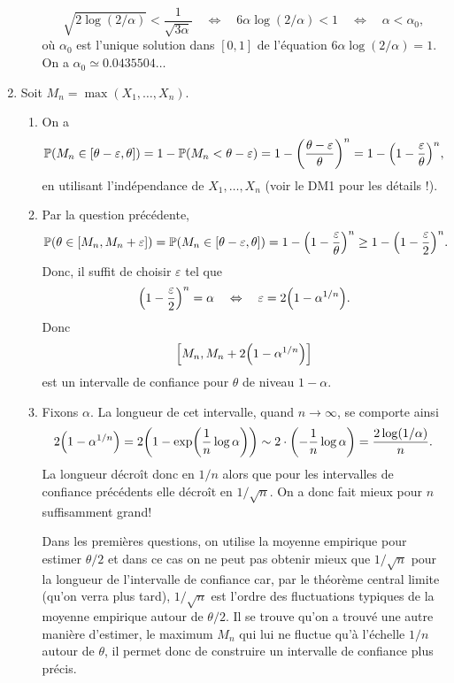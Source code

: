 \documentclass[a4paper,11pt]{article}
\let\originalleft\left
\let\originalright\right
\renewcommand{\left}{\mathopen{}\mathclose\bgroup\originalleft}
\renewcommand{\right}{\aftergroup\egroup\originalright}
\renewcommand{\P}{\mathbb{P}}
\newcommand{\1}{\mathbbm{1}}
\theoremstyle{plain}
\theoremstyle{definition}
\begin{document}
\begin{enumerate}
\begin{enumerate}
		\[
		\sqrt{2 \log(2/\alpha)} < \frac{1}{\sqrt{3\alpha}}
		\quad \Leftrightarrow \quad 
		6 \alpha \log(2/\alpha) < 1
		\quad \Leftrightarrow \quad 
		\alpha < \alpha_0,
		\]
		où $\alpha_0$ est l'unique solution dans $[0,1]$ de l'équation $6 \alpha \log(2/\alpha) = 1$. On a $\alpha_0 \simeq 0.0435504\dots$
	\end{enumerate}
	\item Soit $M_n = \max(X_1,\dots,X_n)$. 
	\begin{enumerate}
		\item On a 
		\[
		\P(M_n \in [\theta - \varepsilon,\theta])
		= 1 - \P(M_n < \theta - \varepsilon) 
		= 1 - \left( \frac{\theta-\varepsilon}{\theta} \right)^n
		= 1 - \left( 1 - \frac{\varepsilon}{\theta} \right)^n,
		\]
		en utilisant l'indépendance de $X_1,\dots,X_n$ (voir le DM1 pour les détails !).
		\item Par la question précédente,
		\[
		\P(\theta \in [M_n,M_n+\varepsilon])
		= \P(M_n \in [\theta - \varepsilon,\theta])
		= 1 - \left( 1 - \frac{\varepsilon}{\theta} \right)^n
		\geq 1 - \left( 1 - \frac{\varepsilon}{2} \right)^n.
		\]
		Donc, il suffit de choisir $\varepsilon$ tel que
		\[
		\left( 1 - \frac{\varepsilon}{2} \right)^n = \alpha 
		\quad \Leftrightarrow \quad 
		\varepsilon = 2 \left( 1- \alpha^{1/n} \right).
		\]
		Donc
		\[ 
		\left[ M_n,M_n+ 2 \left( 1- \alpha^{1/n} \right) \right]
		\]
		est un intervalle de confiance pour $\theta$ de niveau $1-\alpha$.
		\item Fixons $\alpha$. La longueur de cet intervalle, quand $n \to \infty$, se comporte ainsi
		\[
		2 \left( 1- \alpha^{1/n} \right) 
		= 2 \left( 1- \exp \left( \frac{1}{n} \log \alpha \right) \right)
		\sim 2 \cdot \left( - \frac{1}{n} \log \alpha \right)
		= \frac{2 \log (1/\alpha)}{n}.
		\]
		La longueur décroît donc en $1/n$ alors que pour les intervalles de confiance précédents elle décroît en $1/\sqrt{n}$. On a donc fait mieux pour $n$ suffisamment grand!
		
		Dans les premières questions, on utilise la moyenne empirique pour estimer $\theta/2$ et dans ce cas on ne peut pas obtenir mieux que $1/\sqrt{n}$ pour la longueur de l'intervalle de confiance car, par le théorème central limite (qu'on verra plus tard), $1/\sqrt{n}$ est l'ordre des fluctuations typiques de la moyenne empirique autour de $\theta/2$. Il se trouve qu'on a trouvé une autre manière d'estimer, le maximum $M_n$ qui lui ne fluctue qu'à l'échelle $1/n$ autour de $\theta$, il permet donc de construire un intervalle de confiance plus précis.
	\end{enumerate}
\end{enumerate}
\end{document}
